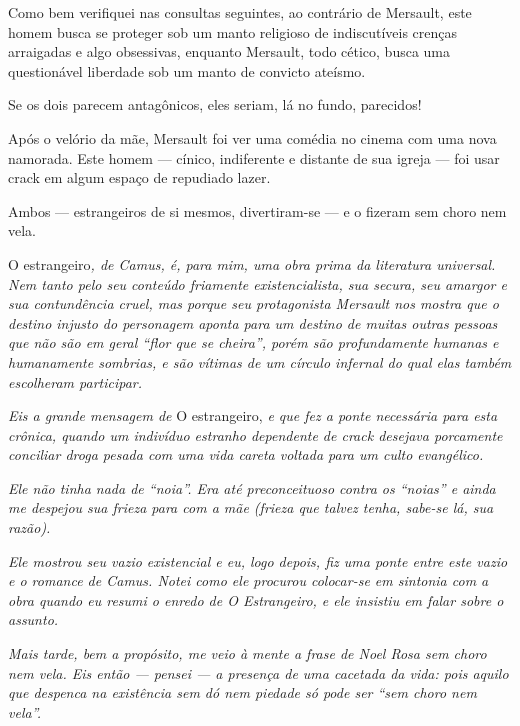 Como bem verifiquei nas consultas seguintes, ao contrário de Mersault,
este homem busca se proteger sob um manto religioso de indiscutíveis
crenças arraigadas e algo obsessivas, enquanto Mersault, todo cético,
busca uma questionável liberdade sob um manto de convicto ateísmo.

Se os dois parecem antagônicos, eles seriam, lá no fundo, parecidos!

Após o velório da mãe, Mersault foi ver uma comédia no cinema com uma
nova namorada. Este homem --- cínico, indiferente e distante de sua
igreja --- foi usar crack em algum espaço de repudiado lazer.

Ambos --- estrangeiros de si mesmos, divertiram-se --- e o fizeram sem
choro nem vela.

\begin{center}\asterisc{}\end{center}
\begingroup\small

O estrangeiro\emph{, de Camus, é, para mim, uma obra prima da literatura
universal. Nem tanto pelo seu conteúdo friamente existencialista, sua
secura, seu amargor e sua contundência cruel, mas porque seu
protagonista Mersault nos mostra que o destino injusto do personagem
aponta para um destino de muitas outras pessoas que não são em geral
``flor que se cheira'', porém são profundamente humanas e humanamente
sombrias, e são vítimas de um círculo infernal do qual elas também
escolheram participar.}

\emph{Eis a grande mensagem de} O estrangeiro, \emph{e que fez a ponte
necessária para esta crônica, quando um indivíduo estranho dependente de
crack desejava porcamente conciliar droga pesada com uma vida careta
voltada para um culto evangélico.}

\emph{Ele não tinha nada de ``noia''. Era até preconceituoso contra os
``noias'' e ainda me despejou sua frieza para com a mãe (frieza que
talvez tenha, sabe-se lá, sua razão).}

\emph{Ele mostrou seu vazio existencial e eu, logo depois, fiz uma ponte
entre este vazio e o romance de Camus. Notei como ele procurou
colocar-se em sintonia com a obra quando eu resumi o enredo de \emph{O
Estrangeiro}, e ele insistiu em falar sobre o assunto.}

\emph{Mais tarde, bem a propósito, me veio à mente a frase de Noel Rosa
sem choro nem vela. Eis então --- pensei --- a presença de uma cacetada
da vida: pois aquilo que despenca na existência sem dó nem piedade só
pode ser ``sem choro nem vela''.}

